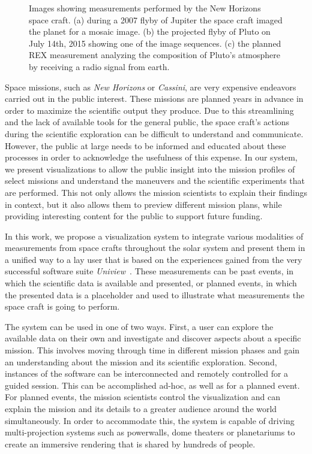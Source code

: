 \documentclass{vgtc}                          %
\begin{document}
\begin{figure}
{  \label{fig:radio}
}
\label{fig:overview}
\caption{Images showing measurements performed by the New Horizons space craft. (a) during a 2007 flyby of Jupiter the space craft imaged the planet for a mosaic image. (b) the projected flyby of Pluto on July 14th, 2015 showing one of the image sequences. (c) the planned REX measurement analyzing the composition of Pluto's atmosphere by receiving a radio signal from earth.}
\end{figure}


Space missions, such as \emph{New Horizons} or \emph{Cassini}, are very expensive endeavors carried out in the public interest. These missions are planned years in advance in order to maximize the scientific output they produce. Due to this streamlining and the lack of available tools for the general public, the space craft's actions during the scientific exploration can be difficult to understand and communicate. However, the public at large needs to be informed and educated about these processes in order to acknowledge the usefulness of this expense. In our system, we present visualizations to allow the public insight into the mission profiles of select missions and understand the maneuvers and the scientific experiments that are performed. This not only allows the mission scientists to explain their findings in context, but it also allows them to preview different mission plans, while providing interesting content for the public to support future funding.

In this work, we propose a visualization system to integrate various modalities of measurements from space crafts throughout the solar system and present them in a unified way to a lay user that is based on the experiences gained from the very successful software suite \emph{Uniview}~\cite{Klashed:2010tr}. These measurements can be past events, in which the scientific data is available and presented, or planned events, in which the presented data is a placeholder and used to illustrate what measurements the space craft is going to perform. 

The system can be used in one of two ways. First, a user can explore the available data on their own and investigate and discover aspects about a specific mission. This involves moving through time in different mission phases and gain an understanding about the mission and its scientific exploration. Second, instances of the software can be interconnected and remotely controlled for a guided session. This can be accomplished ad-hoc, as well as for a planned event. For planned events, the mission scientists control the visualization and can explain the mission and its details to a greater audience around the world simultaneously. In order to accommodate this, the system is capable of driving multi-projection systems such as powerwalls, dome theaters or planetariums to create an immersive rendering that is shared by hundreds of people.
\end{document}
